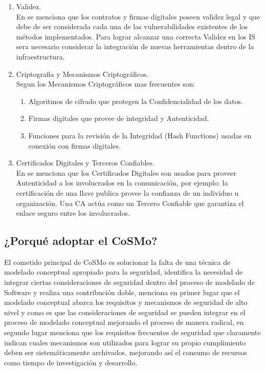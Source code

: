 \documentclass[runningheads,a4paper]{llncs}
\begin{document}
\begin{enumerate}
	\item Validez.\\
	
En \cite{CoSMoIntroduction} se menciona que los contratos y firmas digitales poseen validez legal y que debe de ser considerada cada una de las vulnerabilidades existentes de los métodos implementados. Para lograr alcanzar una correcta Validez en los \gls{IS} sera necesario considerar la integración de nuevas herramientas dentro de la infraestructura.\\

	\item \gls{Criptografia} y Mecanismos Criptográficos.\\

Segun \cite{CoSMoIntroduction} los Mecanismos Criptográficos mas frecuentes son:\\

	\begin{enumerate}
		\item Algoritmos de cifrado que protegen la Confidencialidad de los datos.
		\item Firmas digitales que provee de integridad y Autenticidad.
		\item Funciones para la revisión de la Integridad (\gls{Hash Functions}) usadas en conexión con firmas digitales.\\
	\end{enumerate}

	\item Certificados Digitales y Terceros Confiables.\\
	
En \cite{CoSMoIntroduction} se menciona que los Certificados Digitales son usados para proveer Autenticidad a los involucrados en la comunicación, por ejemplo: la certificación de una llave publica provee la confianza de un individuo u organización. Una \gls{CA} actúa como un Tercero Confiable que garantiza el enlace seguro entre los involucrados.

\end{enumerate}

\subsection{¿Porqué adoptar el \gls{CoSMo}?}
El cometido principal de \gls{CoSMo} es solucionar la falta de una técnica de modelado conceptual apropiado para la seguridad, \cite{CoSMoIntroduction} identifica la necesidad de integrar ciertas consideraciones de seguridad dentro del proceso de modelado de \gls{Software} y realiza una contribución doble, \cite{CoSMoIntroduction} menciona en primer lugar que el modelado conceptual abarca los requisitos y mecanismos de seguridad de alto nivel y como es que las consideraciones de seguridad se pueden integrar en el proceso de modelado conceptual mejorando el proceso de manera radical, en segundo lugar menciona que los requisitos frecuentes de seguridad  que claramente indican cuales mecanismos son utilizados para lograr su propio cumplimiento deben ser sistemáticamente archivados, mejorando así el consumo de recursos como tiempo de investigación y desarrollo. 
\end{document}
